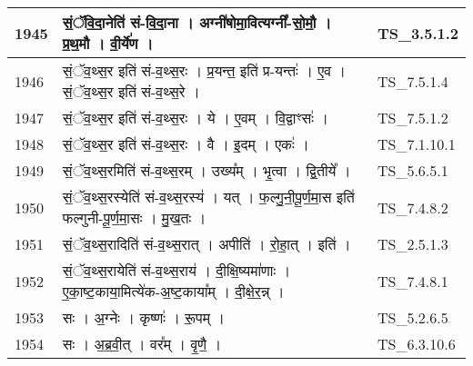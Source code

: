 \documentclass[17pt]{extarticle}
\begin{document}
\begin{longtable}{||p{0.4in}||p{4.9in}||p{0.9in}||}
    \hline
        
    1945 & सं॒ॅवि॒दा॒नेति॑ सं{-}वि॒दा॒ना   ।   अग्नी॑षोमा॒वित्यग्नी᳚{-}सो॒मौ॒   ।   प्र॒थ॒मौ   ।   वी॒र्ये॑ण   ।    & TS\_3.5.1.2       \\
    
    \hline
        
    1946 & सं॒ॅव॒थ्स॒र इति॑ सं{-}व॒थ्स॒रः   ।   प्र॒यन्त॒ इति॑ प्र{-}यन्तः॑   ।   ए॒व   ।   सं॒ॅव॒थ्स॒र इति॑ सं{-}व॒थ्स॒रे   ।    & TS\_7.5.1.4       \\
    
    \hline
        
    1947 & सं॒ॅव॒थ्स॒र इति॑ सं{-}व॒थ्स॒रः   ।   ये   ।   ए॒वम्   ।   वि॒द्वाꣳसः॑   ।    & TS\_7.5.1.2       \\
    
    \hline
        
    1948 & सं॒ॅव॒थ्स॒र इति॑ सं{-}व॒थ्स॒रः   ।   वै   ।   इ॒दम्   ।   एकः॑   ।    & TS\_7.1.10.1       \\
    
    \hline
        
    1949 & सं॒ॅव॒थ्स॒रमिति॑ सं{-}व॒थ्स॒रम्   ।   उख्य᳚म्   ।   भृ॒त्वा   ।   द्वि॒तीये᳚   ।    & TS\_5.6.5.1       \\
    
    \hline
        
    1950 & सं॒ॅव॒थ्स॒रस्येति॑ सं{-}व॒थ्स॒रस्य॑   ।   यत्   ।   फ॒ल्गु॒नी॒पू॒र्ण॒मा॒स इति॑ फल्गुनी{-}पू॒र्ण॒मा॒सः   ।   मु॒ख॒तः   ।    & TS\_7.4.8.2       \\
    
    \hline
        
    1951 & सं॒ॅव॒थ्स॒रादिति॑ सं{-}व॒थ्स॒रात्   ।   अपीति॑   ।   रो॒हा॒त्   ।   इति॑   ।    & TS\_2.5.1.3       \\
    
    \hline
        
    1952 & सं॒ॅव॒थ्स॒रायेति॑ सं{-}व॒थ्स॒राय॑   ।   दी॒क्षि॒ष्यमा॑णाः   ।   ए॒का॒ष्ट॒काया॒मित्ये॑क{-}अ॒ष्ट॒काया᳚म्   ।   दी॒क्षे॒र॒न्न्   ।    & TS\_7.4.8.1       \\
    
    \hline
        
    1953 & सः   ।   अ॒ग्नेः   ।   कृष्णः॑   ।   रू॒पम्   ।    & TS\_5.2.6.5       \\
    
    \hline
        
    1954 & सः   ।   अ॒ब्र॒वी॒त्   ।   वर᳚म्   ।   वृ॒णै॒   ।    & TS\_6.3.10.6       \\
    

\end{longtable}
\end{document}
